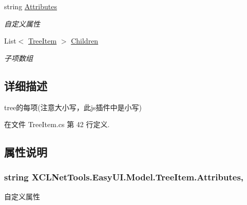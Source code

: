 \begin{DoxyCompactItemize}
string \hyperlink{class_x_c_l_net_tools_1_1_easy_u_i_1_1_model_1_1_tree_item_aa0c852d1b67d5eefacee0463914ec936}{Attributes}
\begin{DoxyCompactList}\small\item\em 自定义属性 \end{DoxyCompactList}\item 
List$<$ \hyperlink{class_x_c_l_net_tools_1_1_easy_u_i_1_1_model_1_1_tree_item}{Tree\-Item} $>$ \hyperlink{class_x_c_l_net_tools_1_1_easy_u_i_1_1_model_1_1_tree_item_a2558788818daccf8bd99032753ebcc29}{Children}
\begin{DoxyCompactList}\small\item\em 子项数组 \end{DoxyCompactList}\end{DoxyCompactItemize}


\subsection{详细描述}
tree的每项(注意大小写，此js插件中是小写) 



在文件 Tree\-Item.\-cs 第 42 行定义.



\subsection{属性说明}
\hypertarget{class_x_c_l_net_tools_1_1_easy_u_i_1_1_model_1_1_tree_item_aa0c852d1b67d5eefacee0463914ec936}{
\subsubsection[{Attributes}]{\setlength{\rightskip}{0pt plus 5cm}string X\-C\-L\-Net\-Tools.\-Easy\-U\-I.\-Model.\-Tree\-Item.\-Attributes\hspace{0.3cm}{\ttfamily [get]}, {\ttfamily [set]}}}\label{class_x_c_l_net_tools_1_1_easy_u_i_1_1_model_1_1_tree_item_aa0c852d1b67d5eefacee0463914ec936}


自定义属性 



